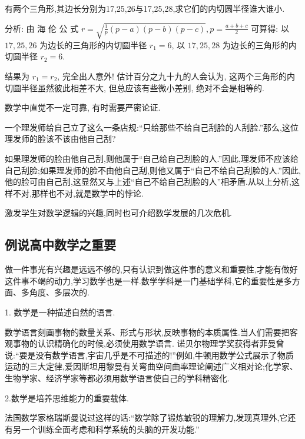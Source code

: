\begin{example}[几何直觉]
	有两个三角形,其边长分别为17,25,26与17,25,28,求它们的内切圆半径谁大谁小.

	分析: 由 海 伦 公 式 $r=\sqrt{\frac{1}{p}(p-a)(p-b)(p-c)}, p=\frac{a+b+c}{2}$ 可算得: 以 $17,25,26$ 为边长的三角形的内切圆半径 $r_1=6$, 以 $17,25,28$ 为边长的三角形的内切圆半径 $r_2=6$.

	结果为 $r_1=r_2$, 完全出人意外! 估计百分之九十九的人会认为, 这两个三角形的内切圆半径虽然彼此相差不大, 但总应该有些微小差别, 绝对不会是相等的.
\end{example}
\begin{purpose}
	数学中直觉不一定可靠, 有时需要严密论证.
\end{purpose}

\begin{example}[数学悖论]
	一个理发师给自己立了这么一条店规:“只给那些不给自己刮脸的人刮脸.”那么,这位理发师的脸该不该由他自己刮?

	如果理发师的脸由他自己刮,则他属于“自己给自己刮脸的人.”因此,理发师不应该给自己刮脸;如果理发师的脸不由他自己刮,则他又属于“自己不给自己刮脸的人.”因此,他的脸可由自己刮,这显然又与上述“自己不给自己刮脸的人”相矛盾.从以上分析,这样不对,那样也不对,就是数学中的悖论.
\end{example}
\begin{purpose}
	激发学生对数学逻辑的兴趣,同时也可介绍数学发展的几次危机.
\end{purpose}

\subsection{例说高中数学之重要}
做一件事光有兴趣是远远不够的,只有认识到做这件事的意义和重要性,才能有做好这件事不竭的动力,学习数学也是一样.数学学科是一门基础学科,它的重要性是多方面、多角度、多层次的.

1. 数学是一种描述自然的语言.

数学语言刻画事物的数量关系、形式与形状,反映事物的本质属性.当人们需要把客观事物的认识精确化的时候,必须使用数学语言. 诺贝尔物理学奖获得者菲曼曾说:“要是没有数学语言,宇宙几乎是不可描述的!”例如,牛顿用数学公式展示了物质运动的三大定律,爱因斯坦用黎曼有关弯曲空间曲率理论阐述广义相对论;化学家、生物学家、经济学家等都必须用数学语言使自己的学科精密化.

2.数学是培养思维能力的重要载体.

法国数学家格瑞斯曼说过这样的话:“数学除了锻炼敏锐的理解力,发现真理外,它还有另一个训练全面考虑和科学系统的头脑的开发功能.”

